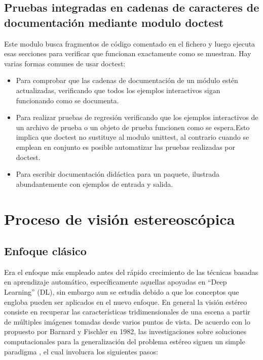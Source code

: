 \subsection{Pruebas integradas en cadenas de caracteres de documentación mediante modulo doctest}
Este modulo busca fragmentos de código comentado en el fichero y luego ejecuta esas secciones para verificar que funcionan exactamente como se muestran. Hay varias formas comunes de usar doctest:
\begin{itemize}
    \item Para comprobar que las cadenas de documentación de un módulo estén actualizadas, verificando que todos los ejemplos interactivos sigan funcionando como se documenta.
    \item Para realizar pruebas de regresión verificando que los ejemplos interactivos de un archivo de prueba o un objeto de prueba funcionen como se espera.Esto implica que doctest no sustituye al modulo unittest, al contrario cuando se emplean en conjunto es posible automatizar las pruebas realizadas por doctest.
    \item Para escribir documentación didáctica para un paquete, ilustrada abundantemente con ejemplos de entrada y salida.
\end{itemize}
\section{Proceso de visión estereoscópica}
\subsection{Enfoque clásico}
Era el enfoque más empleado antes del rápido crecimiento de las técnicas basadas en aprendizaje automático, específicamente aquellas apoyadas en ``Deep Learning'' (DL), sin embargo aun se estudia debido a que los conceptos que engloba pueden ser aplicados en el nuevo enfoque. En general la visión estéreo consiste en recuperar las características tridimensionales de una escena a partir de múltiples imágenes tomadas desde varios puntos de vista. De acuerdo con lo propuesto por Barnard y Fischler en 1982, las investigaciones sobre soluciones computacionales para la generalización del problema estéreo siguen un simple paradigma \cite{Barnard1982}, el cual involucra los siguientes pasos:
